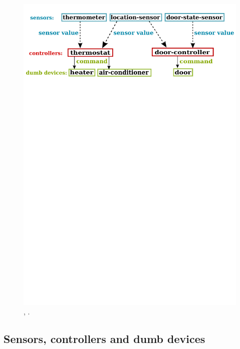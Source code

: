 \documentclass{article}
\begin{document}
\begin{figure}
\begin{center}
\includegraphics[scale=0.6, trim= 0 600 0 0]{figure1.pdf}
\caption{\color{RoyalBlue}{Sensors}, \color{Maroon}{controllers,} \color{black}{and} \color{LimeGreen}{dumb devices}. %
}
\label{fig:arch}
\end{center}
\end{figure}

\subsection{Sensors, controllers and dumb devices}
\end{document}
